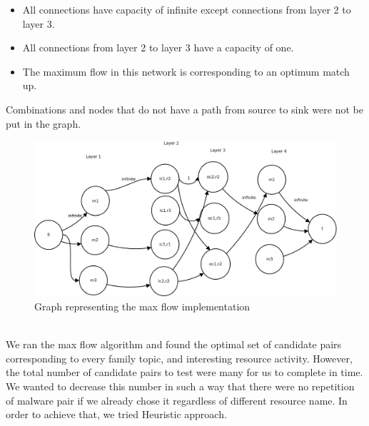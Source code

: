 \begin{itemize}
  \item All connections have capacity of infinite except connections from layer 2 to layer 3.
  \item All connections from layer 2 to layer 3 have a capacity of one.
  \item The maximum flow in this network is corresponding to an optimum match up.
\end{itemize}
Combinations and nodes that do not have a path from source to sink were not be put in the graph.\\
\begin{figure}[h]
  \centering
  \includegraphics[scale=0.23]{figures/maxflow.png}
  \caption[Max Flow]{Graph representing the max flow implementation}\label{fig:maxflow}
\end{figure}
\\
We ran the max flow algorithm and found the optimal set of candidate pairs corresponding to every family topic, and interesting resource activity.
However, the total number of candidate pairs to test were many for us to complete in time.
We wanted to decrease this number in such a way that there were no repetition of malware pair if we already chose it regardless of different resource name.
In order to achieve that, we tried Heuristic approach.
